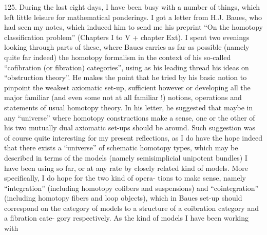 125. During the last eight days, I have been  busy with a
number of things, which left little leisure for mathematical ponderings.
I got a letter from H.J. Baues, who had seen my notes, which induced
him to send me his preprint ``On the homotopy classification problem''
(Chapters I to V + chapter Ext). I spent two evenings looking through
parts of these, where Baues carries as far as possible (namely quite far
indeed) the homotopy formalism  in the context of his so-called
``cofibration (or fibration) categories'', using as his leading thread
his ideas on ``obstruction theory''. He makes the point that he tried by
his basic notion to pinpoi\unsure{\hand{/}}nt the weakest axiomatic set-up, sufficient
however or developing all the major familiar (and even some not at all
familiar !) notions, operations and statements of usual homotopy theory.
In his letter, he suggested that maybe in any ``universe'' where homotopy
constructions make a sense, one or the other of his two mutually dual
axiomatic set-ups should be around. Such suggestion was of course quite
interesting for my present reflections, as I do have the hope indeed
that there exists a ``universe'' of schematic homotopy types, which may
be described in terms of the models (namely semisimplicial unipotent
bundles) I have been using so far, or at any rate by closely related
kind of models. More specifically, I do hope for the two kind of opera-%
tions to make sense, namely ``integration'' (including homotopy cofibers\xout{)}
and suspensions) and ``cointegration'' (including homotopy fibers and
loop objects), which in Baues set-up should correspond on the category
of models to a structure of a coibration category and a fibration cate-%
gory respectively. As the kind of models I have been working with
